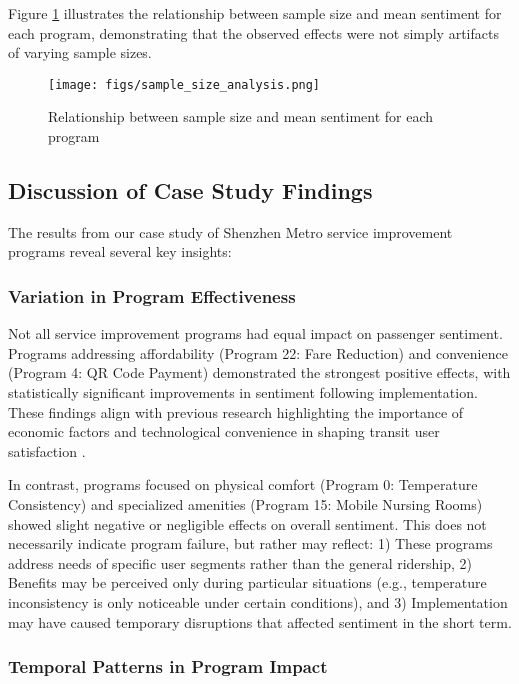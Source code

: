 \documentclass[a4paper,fleqn,12pt]{cas-sc}
\begin{document}
Figure \ref{fig:sample_size_analysis} illustrates the relationship between sample size and mean sentiment for each program, demonstrating that the observed effects were not simply artifacts of varying sample sizes.

\begin{figure}[h]
\centering
\texttt{[image: figs/sample\_size\_analysis.png]}
\caption{Relationship between sample size and mean sentiment for each program}
\label{fig:sample_size_analysis}
\end{figure}

\subsection{Discussion of Case Study Findings}

The results from our case study of Shenzhen Metro service improvement programs reveal several key insights:

\subsubsection{Variation in Program Effectiveness}

Not all service improvement programs had equal impact on passenger sentiment. Programs addressing affordability (Program 22: Fare Reduction) and convenience (Program 4: QR Code Payment) demonstrated the strongest positive effects, with statistically significant improvements in sentiment following implementation. These findings align with previous research highlighting the importance of economic factors and technological convenience in shaping transit user satisfaction \citep{dell2018methodology, de2013composite}.

In contrast, programs focused on physical comfort (Program 0: Temperature Consistency) and specialized amenities (Program 15: Mobile Nursing Rooms) showed slight negative or negligible effects on overall sentiment. This does not necessarily indicate program failure, but rather may reflect: 1) These programs address needs of specific user segments rather than the general ridership, 2) Benefits may be perceived only during particular situations (e.g., temperature inconsistency is only noticeable under certain conditions), and 3) Implementation may have caused temporary disruptions that affected sentiment in the short term.

\subsubsection{Temporal Patterns in Program Impact}
\end{document}
